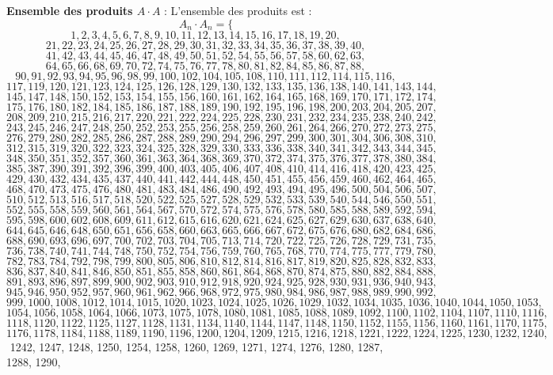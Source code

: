 \documentclass[11pt,a4paper]{article}
\begin{document}
\textbf{Ensemble des produits $A \cdot A$} :
L'ensemble des produits est :
$$ A_{{{n}}} \cdot A_{{{n}}} = \{ $$$$ 1, 2, 3, 4, 5, 6, 7, 8, 9, 10, 11, 12, 13, 14, 15, 16, 17, 18, 19, 20, $$$$ 21, 22, 23, 24, 25, 26, 27, 28, 29, 30, 31, 32, 33, 34, 35, 36, 37, 38, 39, 40, $$$$ 41, 42, 43, 44, 45, 46, 47, 48, 49, 50, 51, 52, 54, 55, 56, 57, 58, 60, 62, 63, $$$$ 64, 65, 66, 68, 69, 70, 72, 74, 75, 76, 77, 78, 80, 81, 82, 84, 85, 86, 87, 88, $$$$ 90, 91, 92, 93, 94, 95, 96, 98, 99, 100, 102, 104, 105, 108, 110, 111, 112, 114, 115, 116, $$$$ 117, 119, 120, 121, 123, 124, 125, 126, 128, 129, 130, 132, 133, 135, 136, 138, 140, 141, 143, 144, $$$$ 145, 147, 148, 150, 152, 153, 154, 155, 156, 160, 161, 162, 164, 165, 168, 169, 170, 171, 172, 174, $$$$ 175, 176, 180, 182, 184, 185, 186, 187, 188, 189, 190, 192, 195, 196, 198, 200, 203, 204, 205, 207, $$$$ 208, 209, 210, 215, 216, 217, 220, 221, 222, 224, 225, 228, 230, 231, 232, 234, 235, 238, 240, 242, $$$$ 243, 245, 246, 247, 248, 250, 252, 253, 255, 256, 258, 259, 260, 261, 264, 266, 270, 272, 273, 275, $$$$ 276, 279, 280, 282, 285, 286, 287, 288, 289, 290, 294, 296, 297, 299, 300, 301, 304, 306, 308, 310, $$$$ 312, 315, 319, 320, 322, 323, 324, 325, 328, 329, 330, 333, 336, 338, 340, 341, 342, 343, 344, 345, $$$$ 348, 350, 351, 352, 357, 360, 361, 363, 364, 368, 369, 370, 372, 374, 375, 376, 377, 378, 380, 384, $$$$ 385, 387, 390, 391, 392, 396, 399, 400, 403, 405, 406, 407, 408, 410, 414, 416, 418, 420, 423, 425, $$$$ 429, 430, 432, 434, 435, 437, 440, 441, 442, 444, 448, 450, 451, 455, 456, 459, 460, 462, 464, 465, $$$$ 468, 470, 473, 475, 476, 480, 481, 483, 484, 486, 490, 492, 493, 494, 495, 496, 500, 504, 506, 507, $$$$ 510, 512, 513, 516, 517, 518, 520, 522, 525, 527, 528, 529, 532, 533, 539, 540, 544, 546, 550, 551, $$$$ 552, 555, 558, 559, 560, 561, 564, 567, 570, 572, 574, 575, 576, 578, 580, 585, 588, 589, 592, 594, $$$$ 595, 598, 600, 602, 608, 609, 611, 612, 615, 616, 620, 621, 624, 625, 627, 629, 630, 637, 638, 640, $$$$ 644, 645, 646, 648, 650, 651, 656, 658, 660, 663, 665, 666, 667, 672, 675, 676, 680, 682, 684, 686, $$$$ 688, 690, 693, 696, 697, 700, 702, 703, 704, 705, 713, 714, 720, 722, 725, 726, 728, 729, 731, 735, $$$$ 736, 738, 740, 741, 744, 748, 750, 752, 754, 756, 759, 760, 765, 768, 770, 774, 775, 777, 779, 780, $$$$ 782, 783, 784, 792, 798, 799, 800, 805, 806, 810, 812, 814, 816, 817, 819, 820, 825, 828, 832, 833, $$$$ 836, 837, 840, 841, 846, 850, 851, 855, 858, 860, 861, 864, 868, 870, 874, 875, 880, 882, 884, 888, $$$$ 891, 893, 896, 897, 899, 900, 902, 903, 910, 912, 918, 920, 924, 925, 928, 930, 931, 936, 940, 943, $$$$ 945, 946, 950, 952, 957, 960, 961, 962, 966, 968, 972, 975, 980, 984, 986, 987, 988, 989, 990, 992, $$$$ 999, 1000, 1008, 1012, 1014, 1015, 1020, 1023, 1024, 1025, 1026, 1029, 1032, 1034, 1035, 1036, 1040, 1044, 1050, 1053, $$$$ 1054, 1056, 1058, 1064, 1066, 1073, 1075, 1078, 1080, 1081, 1085, 1088, 1089, 1092, 1100, 1102, 1104, 1107, 1110, 1116, $$$$ 1118, 1120, 1122, 1125, 1127, 1128, 1131, 1134, 1140, 1144, 1147, 1148, 1150, 1152, 1155, 1156, 1160, 1161, 1170, 1175, $$$$ 1176, 1178, 1184, 1188, 1189, 1190, 1196, 1200, 1204, 1209, 1215, 1216, 1218, 1221, 1222, 1224, 1225, 1230, 1232, 1240, $$$$ 1242, 1247, 1248, 1250, 1254, 1258, 1260, 1269, 1271, 1274, 1276, 1280, 1287, 1288, 1290, 
\end{document}
